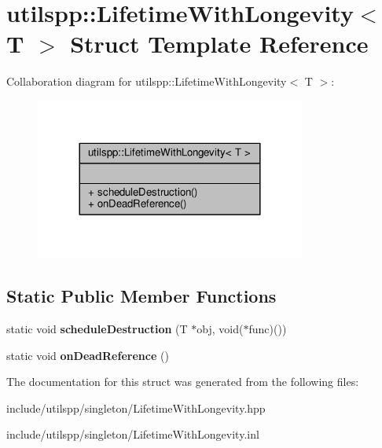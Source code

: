 \hypertarget{structutilspp_1_1LifetimeWithLongevity}{\section{utilspp\-:\-:Lifetime\-With\-Longevity$<$ T $>$ Struct Template Reference}
\label{structutilspp_1_1LifetimeWithLongevity}
}


Collaboration diagram for utilspp\-:\-:Lifetime\-With\-Longevity$<$ T $>$\-:\nopagebreak
\begin{figure}[H]
\begin{center}
\leavevmode
\includegraphics[width=252pt]{structutilspp_1_1LifetimeWithLongevity__coll__graph}
\end{center}
\end{figure}
\subsection*{Static Public Member Functions}
\begin{DoxyCompactItemize}
\item 
\hypertarget{structutilspp_1_1LifetimeWithLongevity_ac6e28f31469a388a34557bcda52294b2}{static void {\bfseries schedule\-Destruction} (T $\ast$obj, void($\ast$func)())}\label{structutilspp_1_1LifetimeWithLongevity_ac6e28f31469a388a34557bcda52294b2}

\item 
\hypertarget{structutilspp_1_1LifetimeWithLongevity_a1d32c3987ba16999fbc981ae4947c7ac}{static void {\bfseries on\-Dead\-Reference} ()}\label{structutilspp_1_1LifetimeWithLongevity_a1d32c3987ba16999fbc981ae4947c7ac}

\end{DoxyCompactItemize}


The documentation for this struct was generated from the following files\-:\begin{DoxyCompactItemize}
\item 
include/utilspp/singleton/Lifetime\-With\-Longevity.\-hpp\item 
include/utilspp/singleton/Lifetime\-With\-Longevity.\-inl\end{DoxyCompactItemize}
